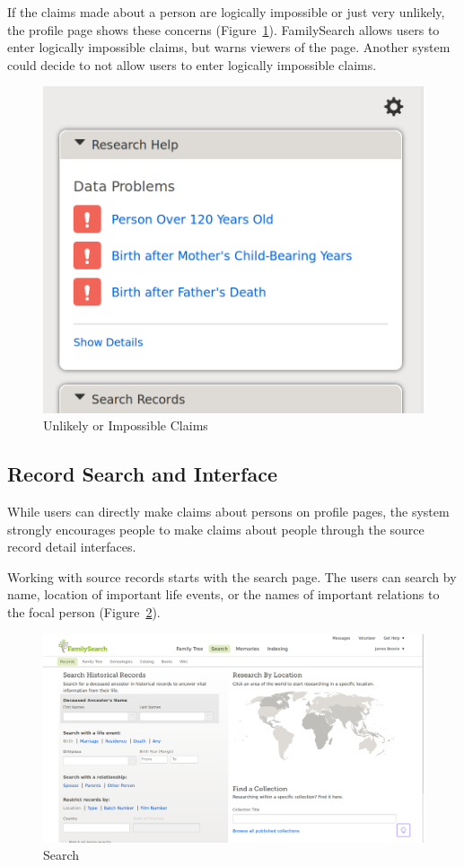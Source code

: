 \documentclass[format=siggraph, review=true]{acmart}
\begin{document}
If the claims made about a person are logically impossible or just
very unlikely, the profile page shows these concerns
(Figure~\ref{fig:data-problems}). FamilySearch allows users to
enter logically impossible claims, but warns viewers of the
page. Another system could decide to not allow users to enter
logically impossible claims.

\begin{figure}[h]
\includegraphics[width=\columnwidth]{images/familysearch/data_problems_detail.png}
\caption{Unlikely or Impossible Claims}
\label{fig:data-problems}
\end{figure}

\subsection*{Record Search and Interface}
While users can directly make claims about persons on profile pages,
the system strongly encourages people to make claims about people
through the source record detail interfaces.

Working with source records starts with the search page. The users can
search by name, location of important life events, or the names of
important relations to the focal person
(Figure~\ref{fig:search-record}).

\begin{figure}[h]
\includegraphics[width=\columnwidth]{images/familysearch/search-records.png}
\caption{Search}
\label{fig:search-record}
\end{figure}
\end{document}
